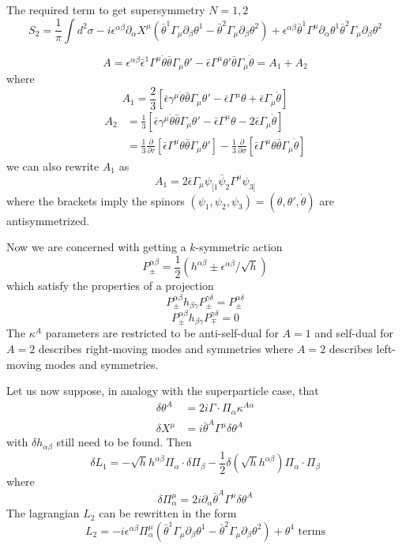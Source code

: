 \documentclass[a4paper,12pt]{article}
\numberwithin{equation}{section}
\numberwithin{thm}{section}
\numberwithin{exm}{section}
\newcommand{\p}{\partial}
\newcommand{\<}{{\langle}}
\renewcommand{\>}{{\rangle}}
\renewcommand{\a}{{\alpha}}
\renewcommand{\b}{{\beta}}
\renewcommand{\d}{{\delta}}
\newcommand{\e}{{\epsilon}}
\newcommand{\eb}{{\bar\epsilon}}
\newcommand{\g}{{\gamma}}
\newcommand{\G}{{\Gamma}}
\renewcommand{\k}{{\kappa}}
\newcommand{\m}{{\mu}}
\newcommand{\s}{{\sigma}}
\renewcommand{\t}{{\theta}}
\newcommand{\tb}{{\bar\theta}}
\begin{document}
The required term to get supersymmetry $N=1,2$
	\begin{equation}
	S_2  = \frac{1}{\pi} \int d^2\s -i\e^{\a\b}\p_\a X^\m(\tb^1\G_\m\p_\b\t^1 - \tb^2 \G_\m \p_\b\t^2) + \e^{\a\b} \tb^1 \G^\m \p_\a\t^1\tb^2\G_\m\p_\b\t^2
	\end{equation}

	\begin{equation}
	A = \e^{\a\b} \eb^1 \G^\m \dot\t\tb \G_\m \t' - \eb \G^\m \t'\tb\G_\m\dot\t = A_1 + A_2
	\end{equation}
where
	\begin{equation}
	A_1 = \frac{2}{3} [\eb\g^\m\dot\t\tb\G_\m\t' - \eb\G^\m\t + \eb\G_\m\dot\t]
	\end{equation}
	\begin{align}
	A_2 & = \frac{1}{3} [\eb\g^\m\dot\t\tb\G_\m\t' - \eb\G^\m\t - 2 \eb\G_\m\dot\t] \nonumber \\
	& = \frac{1}{3} \frac{\p}{\p\tau}[\eb\G^\m\t\tb\G_\m\t'] - \frac{1}{3} \frac{\p}{\p\s} [\eb\G^\m \t\tb\G_\m\dot\t]
	\end{align}
we can also rewrite $A_1$ as
	\begin{equation}
	A_1 = 2\eb\G_\m\psi_{[1}\bar\psi_2\G^\m \psi_{3]}
	\end{equation}
where the brackets imply the spinors $(\psi_1,\psi_2,\psi_3) = (\t,\t',\dot\t)$ are antisymmetrized.

Now we are concerned with getting a $k$-symmetric action
	\begin{equation}
	P^{\a\b}_\pm = \frac{1}{2} (h^{\a\b} \pm \e^{\a\b}/\sqrt{h})
	\end{equation}
which satisfy the properties of a projection
	\begin{equation}
	P^{\a\b}_\pm h_{\b\g} P^{\g\d}_\pm = P^{\a\d}_\pm
	\end{equation}
	\begin{equation}
	P^{\a\b}_\pm h_{\b\g} P^{\g\d}_\mp = 0
	\end{equation}
The $\k^A$ parameters are restricted to be anti-self-dual for $A = 1$ and self-dual for $A = 2$ describes right-moving modes and symmetries where $A = 2$ describes left-moving modes and symmetries.

Let us now suppose, in analogy with the superparticle case, that
	\begin{align}
	\d \t^A & = 2i\G\cdot\Pi_\a \k^{A\a} \\
	\d X^\m & = i\tb^A\G^\m\d\t^A
	\end{align}
with $\d h_{\a\b}$ still need to be found. Then
	\begin{equation}
	\d L_1 = -\sqrt{h} h^{\a\b} \Pi_\a\cdot\d\Pi_\b - \frac{1}{2}\d(\sqrt{h} h^{\a\b})\Pi_\a\cdot\Pi_\b
	\end{equation}
where
	\begin{equation}
	\d \Pi^\m_\a = 2i\p_\a\tb^A\G^\m\d\t^A
	\end{equation}
The lagrangian $L_2$ can be rewritten in the form
	\begin{equation}
	L_2 = -i \e^{\a\b} \Pi^\m_\a(\tb^1\G_\m\p_\b\t^1 - \tb^2\G_\m\p_\b\t^2) + \t^4\text{ terms}
	\end{equation}
\end{document}
